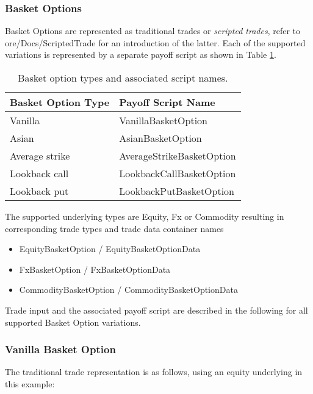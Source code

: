 \subsubsection{Basket Options}

Basket Options are represented as traditional trades or {\em scripted trades}, refer to ore/Docs/ScriptedTrade
for an introduction of the latter. Each of the supported variations is represented by a separate payoff script as shown
in Table \ref{tab:basketoptions}.

\begin{table}[hbt]
\begin{center}
\begin{tabular}{|l|l|}
\hline
Basket Option Type & Payoff Script Name \\
\hline
\hline
Vanilla & VanillaBasketOption \\
\hline
Asian & AsianBasketOption \\
\hline
Average strike & AverageStrikeBasketOption \\
\hline
Lookback call & LookbackCallBasketOption \\
\hline
Lookback put & LookbackPutBasketOption \\
\hline
\end{tabular}
\end{center}
\caption{Basket option types and associated script names.}
\label{tab:basketoptions}
\end{table}

The supported underlying types are Equity, Fx or Commodity resulting in corresponding trade types and trade data
container names

\begin{itemize}
  \item EquityBasketOption / EquityBasketOptionData
  \item FxBasketOption / FxBasketOptionData
  \item CommodityBasketOption / CommodityBasketOptionData
\end{itemize}

Trade input and the associated payoff script are described in the following for all supported Basket Option variations.

\subsubsection*{Vanilla Basket Option}

The traditional trade representation is as follows, using an equity underlying in this example:

